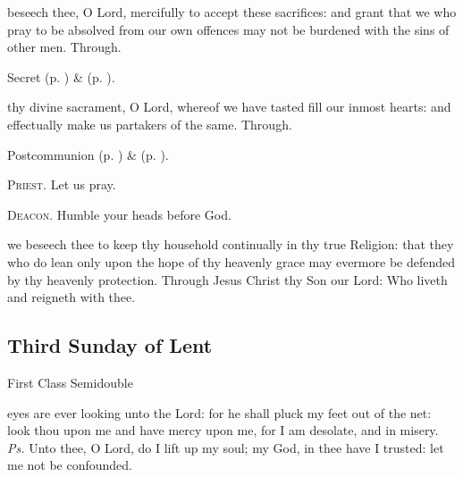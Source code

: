 
\secret
{} beseech thee, O Lord, mercifully to accept these sacrifices: and grant that we who pray to be absolved from our own offences may not be burdened with the sins of other men. Through.

\begin{rubric}
     Secret  (p. \pageref{AshWednesdayMassSecret}) \&   (p. \pageref{SPLivingDeparted}).
\end{rubric}


\postcommunion
{} thy divine sacrament, O Lord, whereof we have tasted fill our inmost hearts: and effectually make us partakers of the same. Through.


\begin{rubric}
     Postcommunion  (p. \pageref{AshWednesdayMassPostcommunion}) \&   (p. \pageref{SPLivingDeparted}).
\end{rubric}

\textsc{Priest.} Let us pray.\par
\textsc{Deacon.} Humble your heads before God.\par
{} we beseech thee to keep thy household continually in thy true Religion: that they who do lean only upon the hope of thy heavenly grace may evermore be defended by thy heavenly protection. Through Jesus Christ thy Son our Lord: Who liveth and reigneth with thee.


\subsection{Third Sunday of Lent}
\begin{inhead}
{First Class Semidouble}
\end{inhead}


\introit
{} eyes are ever looking unto the Lord: for he shall pluck my feet out of the net: look thou upon me and have mercy upon me, for I am desolate, and in misery. \textit{Ps.} Unto thee, O Lord, do I lift up my soul; my God, in thee have I trusted: let me not be confounded.

